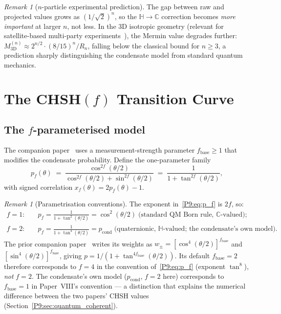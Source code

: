 \documentclass[11pt,a4paper]{article}
\theoremstyle{definition}
\theoremstyle{remark}
\newtheorem{remark}[theorem]{Remark}
\newcommand{\CC}{\mathbb{C}}
\newcommand{\HH}{\mathbb{H}}
\newcommand{\pcond}{p_{\mathrm{cond}}}
\begin{document}
\begin{remark}[$n$-particle experimental prediction]
\label{P9:rem:n_particle_prediction}
The gap between raw and projected values grows as $(1/\sqrt{2})^n$, so
the $\HH\to\CC$ correction becomes \emph{more important} at larger $n$,
not less.
In the 3D isotropic geometry (relevant for satellite-based multi-party
experiments~\cite{Paper8}), the Mermin value degrades further:
$M^{(n)}_\mathrm{3D}\approx 2^{n/2}\cdot(8/15)^n/R_n$,
falling below the classical bound for $n\geq3$, a prediction sharply
distinguishing the condensate model from standard quantum mechanics.
\end{remark}
 
\section{The CHSH$(f)$ Transition Curve}
\label{P9:sec:chshf}
 
\subsection{The $f$-parameterised model}
 
The companion paper~\cite{Paper8} uses a measurement-strength
parameter $f_\mathrm{base}\geq1$ that modifies the condensate probability.
Define the one-parameter family
\begin{equation}
  p_f(\theta)
  \;=\; \frac{\cos^{2f}(\theta/2)}{\cos^{2f}(\theta/2)+\sin^{2f}(\theta/2)}
  \;=\; \frac{1}{1+\tan^{2f}(\theta/2)},
  \label{P9:eq:p_f}
\end{equation}
with signed correlation $x_f(\theta) = 2p_f(\theta)-1$.
 
\begin{remark}[Parametrisation conventions]
\label{P9:rem:f_convention}
The exponent in~\eqref{P9:eq:p_f} is $2f$, so:
\begin{align*}
  f=1:&\quad p_f = \tfrac{1}{1+\tan^2(\theta/2)} = \cos^2(\theta/2)
         \;\text{(standard QM Born rule, $\CC$-valued);}\\
  f=2:&\quad p_f = \tfrac{1}{1+\tan^4(\theta/2)} = \pcond
         \;\text{(quaternionic, $\HH$-valued; the condensate's own model).}
\end{align*}
The prior companion paper~\cite{Paper8} writes its weights as
$w_\pm = [\cos^4(\theta/2)]^{f_\mathrm{base}}$ and $[\sin^4(\theta/2)]^{f_\mathrm{base}}$,
giving $p = 1/(1+\tan^{4f_\mathrm{base}}(\theta/2))$.
Its default $f_\mathrm{base}=2$ therefore corresponds to $f=4$ in
the convention of~\eqref{P9:eq:p_f} (exponent $\tan^8$), \emph{not} $f=2$.
The condensate's own model ($\pcond$, $f=2$ here) corresponds to
$f_\mathrm{base}=1$ in Paper~VIII's convention --- a distinction that
explains the numerical difference between the two papers' CHSH values
(Section~\ref{P9:sec:quantum_coherent}).
\end{remark}
\end{document}
